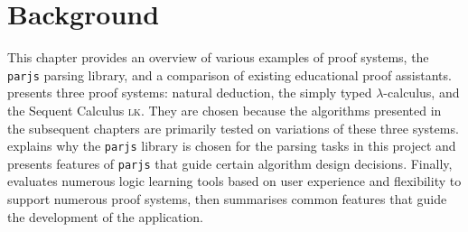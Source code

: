 \chapter{Background}\label{background}
This chapter provides an overview of various examples of proof systems, the \lstinline{parjs} parsing library, and a comparison of existing educational proof assistants.  presents three proof systems: natural deduction, the simply typed $\lambda$-calculus, and the Sequent Calculus \textsc{lk}. They are chosen because the algorithms presented in the subsequent chapters are primarily tested on variations of these three systems.  explains why the \lstinline{parjs} library is chosen for the parsing tasks in this project and presents features of \lstinline{parjs} that guide certain algorithm design decisions. Finally,  evaluates numerous logic learning tools based on user experience and flexibility to support numerous proof systems, then summarises common features that guide the development of the application.




